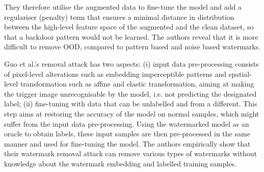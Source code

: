 They therefore utilise the augmented data to fine-tune the model and add a regulariser (penalty) term that ensures a minimal distance in distribution between the high-level feature space of the augmented and the clean dataset, so that a backdoor pattern would not be learned.
The authors reveal that it is more difficult to remove OOD, compared to pattern based and noise based watermarks.


Guo et al.'s removal attack \cite{guo_hidden_2020} %
has two aspects: (i) input data pre-processing consists of pixel-level alterations such as embedding imperceptible patterns and spatial-level transformation such as affine and elastic transformation, aiming at making the trigger image unrecognisable by the model, i.e. not predicting the designated label; (ii) fine-tuning with data that can be unlabelled and from a different. This step aims at restoring the accuracy of the model on normal samples, which might suffer from the input data pre-processing. Using the watermarked model as an oracle to obtain labels, these input samples are then pre-processed in the same manner and used for fine-tuning the model.
The authors empirically show that their watermark removal attack can remove various types of watermarks without knowledge about the watermark embedding and labelled training samples.

